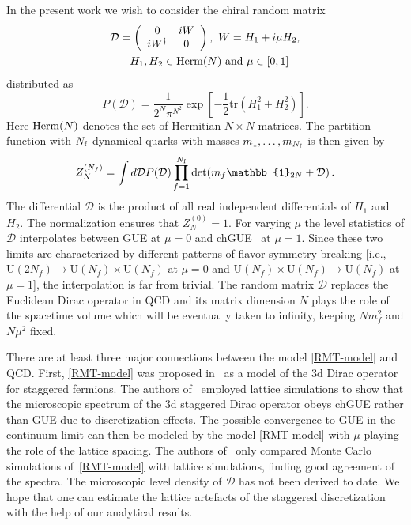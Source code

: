 \documentclass[aps,prl,reprint,graphicx,showpacs]{revtex4-1}
\newcommand{\tr}{\text{tr}}
\newcommand{\id}{\mathbb{1}}
\newcommand{\U}{\text{U}}
\begin{document}
In the present work we wish to consider the chiral random matrix
\begin{equation}\label{RMT-model} 
\begin{split}
 \mathcal{D} =\left(\begin{array}{cc} 0 & iW \\ iW^\dagger & 0 \end{array}\right), ~
 W= H_1+i\mu H_2,\\
 H_1,H_2\in{\rm Herm}(N)\ \text{and}\ \mu\in[0,1]~~~
\end{split}
\end{equation}
distributed as
\begin{equation}\label{distribution}
P(\mathcal{D})= \frac{1}{2^N \pi^{N^2}}\exp\left[-\frac{1}{2}\tr(H_1^2+H_2^2)\right].
\end{equation}
Here ${\rm Herm}(N)$ denotes the set of Hermitian $N\times N$ matrices. 
The partition function with $N_{\rm f}$ dynamical quarks with masses $m_1,\ldots,m_{N_{\rm f}}$ is then given by
\begin{equation}\label{eq:0Zdef}
		Z_N^{(N_f)} = \int d\mathcal{D} P(\mathcal{D})\prod_{f=1}^{N_{\rm f}}\det(m_f \id_{2N} +\mathcal{D})\,.
\end{equation}
The differential $\mathcal{D}$ is the product of all real independent differentials of $H_1$ and $H_2$.
The normalization ensures that $Z_N^{(0)}=1$.  For varying $\mu$ the level statistics of $\mathcal{D}$ 
interpolates between GUE \cite{Verbaarschot:1994ip,Mehta_book} at $\mu=0$ and chGUE~\cite{Shuryak:1992pi,Verbaarschot:1993pm,Mehta_book} at $\mu=1$. Since these two limits are characterized by different patterns of flavor symmetry breaking [i.e., $\U(2N_f)\to \U(N_f)\times\U(N_f)$ at $\mu=0$ and $\U(N_f)\times\U(N_f)\to \U(N_f)$ at $\mu=1$], the interpolation is far from trivial. The random matrix $\mathcal{D}$ replaces the Euclidean Dirac operator in QCD and its matrix dimension $N$ plays the role of the spacetime volume which will be eventually taken to infinity, keeping $Nm_f^2$ and $N\mu^2$ fixed.

There are at least three major connections between the model \eqref{RMT-model} and QCD. First, \eqref{RMT-model} was proposed in~\cite{Bialas:2010hb} as a model of the 3d Dirac operator for staggered fermions. The authors of~\cite{Bialas:2010hb} employed lattice simulations to show that the microscopic spectrum of the 3d staggered Dirac operator obeys chGUE rather than GUE due to discretization effects. The possible convergence to GUE in the continuum limit can then be modeled by the model \eqref{RMT-model} with $\mu$ playing the role of the lattice spacing. The authors of~\cite{Bialas:2010hb} only compared Monte Carlo simulations of~\eqref{RMT-model} with lattice simulations, finding good agreement of the spectra. The microscopic level density of $\mathcal{D}$ has not been derived to date. {  We hope that one can estimate the lattice artefacts of the staggered discretization with the help of our analytical results.}
\end{document}
